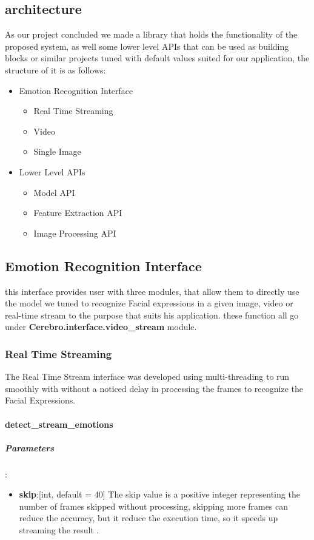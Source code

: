 \subsection{architecture}
As our project concluded we made a library that holds the functionality of the proposed system, as well some lower level APIs that can be used as building blocks or similar projects tuned with default values suited for our application, the structure of it is as follows:
\begin{itemize}
	\item Emotion Recognition Interface 
	\begin{itemize}[noitemsep,nolistsep]
		\item Real Time Streaming
		\item Video
		\item Single Image
	\end{itemize}
	\item Lower Level APIs
	\begin{itemize}[noitemsep,nolistsep]
		\item Model API
		\item Feature Extraction API
		\item Image Processing API
	\end{itemize}
\end{itemize}

\subsection{Emotion Recognition Interface}
this interface provides user with three modules, that allow them to directly use the model we tuned to recognize Facial expressions in a given image, video or real-time stream to the purpose that suits his application.\newline
these function all go under \textbf{Cerebro.interface.video\_stream} module.

\subsubsection{Real Time Streaming}
The Real Time Stream interface was developed using multi-threading to run smoothly with without a noticed delay in processing the frames to recognize the Facial Expressions. 

\paragraph{detect\_stream\_emotions}%
\subparagraph{Parameters}:
\begin{changemargin}{0.5cm}{0cm} 
	\begin{itemize}[noitemsep,nolistsep]
		\item\textbf{skip}:[int, default = 40] The skip value is a positive integer representing the number of frames skipped without processing, skipping more frames can reduce the accuracy, but it reduce the execution time, so it speeds up streaming the result .
	\end{itemize}
\end{changemargin}

